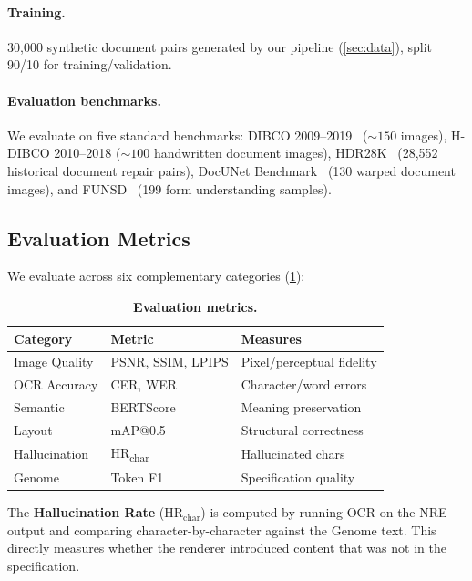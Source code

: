 \documentclass[conference]{IEEEtran}
\newcommand{\nre}{\textsc{NRE}}
\begin{document}
\paragraph{Training.}
30{,}000 synthetic document pairs generated by our pipeline
(\cref{sec:data}), split 90/10 for training/validation.

\paragraph{Evaluation benchmarks.}
We evaluate on five standard benchmarks:
DIBCO 2009--2019~\cite{pratikakis2019dibco} (${\sim}150$ images),
H-DIBCO 2010--2018 (${\sim}100$ handwritten document images),
HDR28K~\cite{chen2024diffhdr} (28{,}552 historical document repair pairs),
DocUNet Benchmark~\cite{ma2018docunet} (130 warped document images), and
FUNSD~\cite{jaume2019funsd} (199 form understanding samples).

\subsection{Evaluation Metrics}
\label{sec:metrics}

We evaluate across six complementary categories (\cref{tab:metrics}):

\begin{table}[t]
  \centering
  \small
  \caption{\textbf{Evaluation metrics.}}
  \label{tab:metrics}
  \begin{tabular}{@{}llp{3cm}@{}}
    \toprule
    \textbf{Category} & \textbf{Metric} & \textbf{Measures} \\
    \midrule
    Image Quality     & PSNR, SSIM, LPIPS & Pixel/perceptual fidelity \\
    OCR Accuracy      & CER, WER          & Character/word errors \\
    Semantic          & BERTScore          & Meaning preservation \\
    Layout            & mAP@0.5           & Structural correctness \\
    Hallucination     & HR\textsubscript{char} & Hallucinated chars \\
    Genome            & Token F1           & Specification quality \\
    \bottomrule
  \end{tabular}
\end{table}

\noindent The \textbf{Hallucination Rate} ($\text{HR}_\text{char}$) is computed by
running OCR on the \nre{} output and comparing character-by-character against the
Genome text.  This directly measures whether the renderer introduced content that
was not in the specification.
\end{document}
